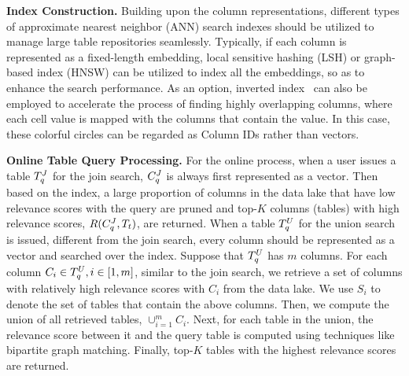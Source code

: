 
\noindent\textbf{Index Construction.} Building upon the  column representations, different types of approximate nearest neighbor (ANN) search indexes should be utilized to manage large table repositories seamlessly. Typically, if each column is represented as a fixed-length embedding, local sensitive hashing (LSH) or graph-based index (HNSW) can be utilized to index all the embeddings, so as to enhance the search performance.
 As an option, inverted index~\cite{} can also be employed  to  accelerate the process of finding highly overlapping columns, where each cell value is mapped with the columns that contain the value. In this case, these colorful circles can be regarded as  Column IDs rather than vectors.





\noindent\textbf{Online Table Query Processing.} For the online process, when a user issues a table $T^J_q$ for the join search, $C^J_q$ is always first represented as a vector. Then based on the index, a large proportion of columns in the data lake that have low relevance scores with the query are pruned and top-$K$ columns (tables) with high relevance scores, \ie $R(C^J_q, T_t)$, are returned. When a table $T^U_q$ for the union search is issued, different from the join search, every column should be represented as a vector and searched over the index.
Suppose that $T^U_q$ has $m$ columns. 
 For each column $C_i \in T^U_q, i \in [1,m]$, similar to the join search, we retrieve a set of columns with relatively high relevance scores with $C_i$ from the data lake. We use $S_i$ to denote the set of tables that contain the above columns.
Then, we compute the union of all retrieved tables, \ie $\cup_{i=1}^m C_i$. Next, for each table in the union, the relevance score between it and the query table is computed using techniques like bipartite graph matching. Finally, top-$K$ tables with the highest relevance scores are returned.





